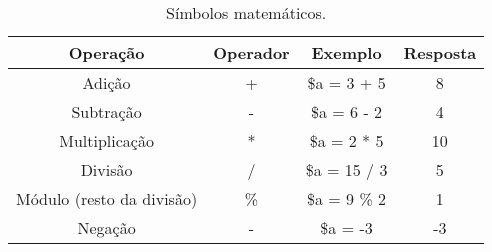 \begin{table}[h]
\caption{Símbolos matemáticos.}\label{tab:cap4-operadores-aritmeticos}
\begin{center}
\begin{tabular}{|c|c|c|c|}
\hline
  \multicolumn{1}{|c|}{ \textbf{Operação}}
&  \multicolumn{1}{|c|}{ \textbf{Operador}} 
&  \multicolumn{1}{|c|}{ \textbf{Exemplo}} 
&  \multicolumn{1}{|c|}{ \textbf{Resposta}} \\
\hline
\hline
Adição                    & + & \$a = 3 + 5 & 8   \\ \hline
Subtração                 & - & \$a = 6 - 2 & 4   \\ \hline
Multiplicação             & * & \$a = 2 * 5 & 10  \\ \hline
Divisão                   & / & \$a = 15 / 3 & 5  \\ \hline
Módulo (resto da divisão) & \% & \$a = 9 \% 2 & 1  \\ \hline
Negação                   & - & \$a = -3 & -3  \\ \hline
\end{tabular}
\end{center}
\end{table}
